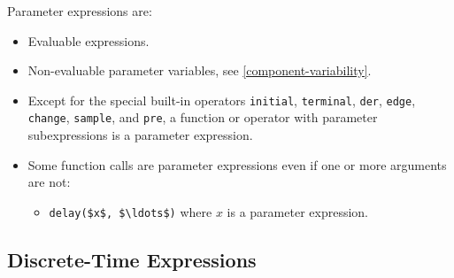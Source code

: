 Parameter expressions are:
\begin{itemize}
\item
  Evaluable expressions.
\item
  Non-evaluable parameter variables, see \cref{component-variability}.
\item
  Except for the special built-in operators \lstinline!initial!, \lstinline!terminal!, \lstinline!der!, \lstinline!edge!, \lstinline!change!, \lstinline!sample!, and \lstinline!pre!, a function or operator with parameter subexpressions is a parameter expression.
\item
  Some function calls are parameter expressions even if one or more arguments are not:
  \begin{itemize}
  \item
    \lstinline!delay($x$, $\ldots$)! where $x$ is a parameter expression.
  \end{itemize}
\end{itemize}

\subsection{Discrete-Time Expressions}\label{discrete-time-expressions}

